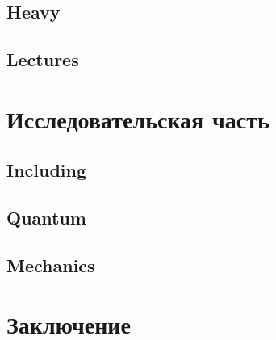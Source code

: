 \documentclass[a4paper,oneside,14pt]{extarticle}
\begin{document}
\subsection{Heavy}
\subsection{Lectures}
\Blindtext
\newpage
\section{Исследовательская часть}
\subsection{Including}
\subsection{Quantum}
\subsection{Mechanics}
\Blindtext
\newpage
\section*{Заключение}
\Blindtext \cite{Lev1965}

\newpage

\end{document}
